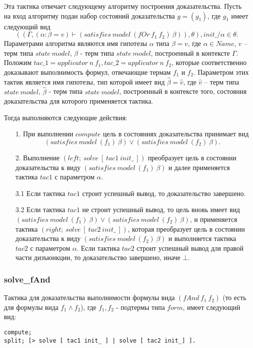 \documentclass[12pt]{article}
\begin{document}
Эта тактика отвечает следующему алгоритму построения доказательства.
Пусть на вход алгоритму подан набор состояний доказательства $g = (g_1)$, где $g_1$ имеет следующий вид 
$$((\Gamma, (\alpha: \beta = v) \vdash (satisfies\ model\ (fOr\ f_1\ f_2)\ \beta)), \theta), init\_/\alpha \in \theta.$$ Параметрами алгоритма являются имя гипотезы $\alpha$ типа $\beta = v$, где $\alpha \in Name$, $v$ -- терм типа $state\ model$, $\beta$ - терм типа $state\ model$, построенный в контексте $\Gamma$. Положим $tac\_1 = applicator\ n \ f_1, tac\_2 = applicator\ n \ f_2$, которые соответственно доказывают выполнимость формул, отвечающие термам $f_1$ и $f_2$. Параметром этих тактик является имя гипотезы, тип которой имеет вид  $\hat{\beta} = \hat{v}$, где $\hat{v}$ -- терм типа $state\ model$, $\hat{\beta}$ - терм типа $state\ model$, построенный в контексте того, состояния доказательства для которого применяется тактика.

Тогда выполняются следующие действия:
\begin{enumerate}
    \item[1.] При выполнении $compute$ цель в состояниях доказательства принимает вид
    $$(satisfies\ model\ (f_1)\ \beta) \vee (satisfies\ model\ (f_2)\ \beta).$$
    \item[2.] Выполнение $(left;\ solve\ [\ tac1\ init\_\ ])$ преобразует цель в состоянии доказательства к виду $(satisfies\ model\ (f_1)\ \beta)$ и далее применяется тактика $tac1$ с параметром $\alpha$.
    \item[3.1] Если тактика $tac1$ строит успешный вывод, то доказательство завершено.
    \item[3.2] Если тактика $tac1$ не строит успешный вывод, то цель вновь имеет вид $(satisfies\ model\ (f_1)\ \beta) \vee (satisfies\ model\ (f_2)\ \beta)$, и применяется тактика $(right;\ solve\ [\ tac2\ init\_\ ])$, которая преобразует цель в состоянии доказательства к виду $(satisfies\ model\ (f_2)\ \beta)$ и выполняется тактика $tac2$ с параметром $\alpha$. Если тактика $tac2$ строит успешный вывод для правой части дизъюнкции, то доказательство завершено, иначе $\bot$.
\end{enumerate}



\subsubsection{solve\_fAnd}
Тактика для доказательства выполнимости формулы вида $(fAnd\ f_1\ f_2)$ (то есть для формулы вида $f_1 \wedge f_2$), где $f_1,f_2$ - подтермы типа $form$, имеет следующий вид:
\begin{verbatim}
compute;
split; [> solve [ tac1 init_ ] | solve [ tac2 init_] ].
\end{verbatim}
\end{document}
